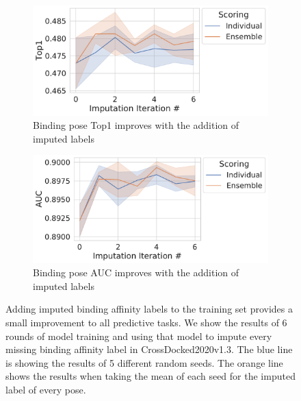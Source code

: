 \documentclass[journal=jmcmar,manuscript=article]{achemso}
\begin{document}
\begin{figure}[tbph]
    \begin{subfigure}[t]{0.48\textwidth}
        \centering
        \includegraphics[width=\linewidth]{figures/InitialImpTop1.pdf}
        \caption{Binding pose Top1 improves with the addition of imputed labels}
    \end{subfigure}
    \hfill
    \begin{subfigure}[t]{0.48\textwidth}
        \centering
        \includegraphics[width=\linewidth]{figures/InitialImpAUC.pdf}
        \caption{Binding pose AUC improves with the addition of imputed labels}
    \end{subfigure}
    \caption{Adding imputed binding affinity labels to the training set provides a small improvement to all predictive tasks. We show the results of 6 rounds of model training and using that model to impute every missing binding affinity label in CrossDocked2020v1.3. The blue line is showing the results of 5 different random seeds. The orange line shows the results when taking the mean of each seed for the imputed label of every pose.}
    \label{fig:initialImp}
\end{figure}
\end{document}
